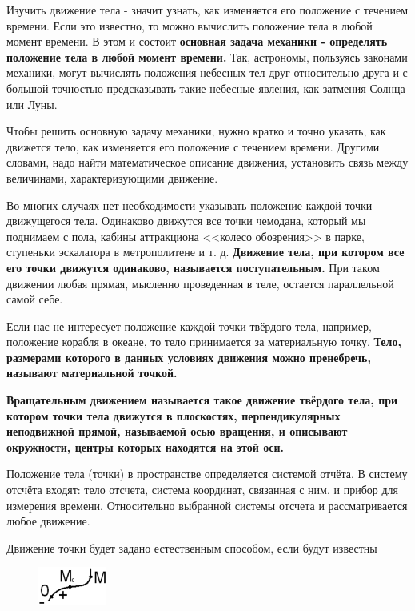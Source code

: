 \documentclass[a6paper, 11pt]{diss_4}
\renewcommand{\'}{\,'}
\begin{document}
  Изучить движение тела - значит узнать, как изменяется его положение с
течением времени. Если это известно, то можно вычислить положение тела в любой
момент времени. В этом и состоит \textbf{основная задача механики - определять
положение тела в любой момент времени.} Так, астрономы, пользуясь законами
механики, могут вычислять положения небесных тел друг относительно друга и с
большой точностью предсказывать такие небесные явления, как затмения Солнца или
Луны.

  Чтобы решить основную задачу механики, нужно кратко и точно указать,
как движется тело, как изменяется его положение с течением времени. Другими
словами, надо найти математическое описание движения, установить связь между
величинами, характеризующими движение.

  Во многих случаях нет необходимости указывать положение каждой точки
движущегося тела. Одинаково движутся все точки чемодана, который мы поднимаем с
пола, кабины аттракциона <<колесо обозрения>> в парке, ступеньки эскалатора в
метрополитене и т. д. \textbf{Движение тела, при котором все его точки движутся
одинаково, называется поступательным.} При таком движении любая прямая, мысленно
проведенная в теле, остается параллельной самой себе.

  Если нас не интересует положение каждой точки твёрдого тела, например,
положение корабля в океане, то тело принимается за материальную точку.
\textbf{Тело, размерами которого в данных условиях движения можно пренебречь,
называют материальной точкой. }

\textbf{  Вращательным движением называется такое движение твёрдого тела, при
котором точки тела движутся в плоскостях, перпендикулярных неподвижной прямой,
называемой осью вращения, и описывают окружности, центры которых находятся на
этой оси. }


  Положение тела (точки) в пространстве определяется системой отчёта. В
систему отсчёта входят: тело отсчета, система координат, связанная с ним, и
прибор для измерения времени. Относительно выбранной системы отсчета и
рассматривается любое движение.

  Движение точки будет задано естественным способом, если будут известны

\begin{figure}[h]
\begin{center}
\includegraphics*[width=0.2\textwidth]{img/img04.eps}
\label{fig1}
\end{center}\end{figure}
\end{document}
